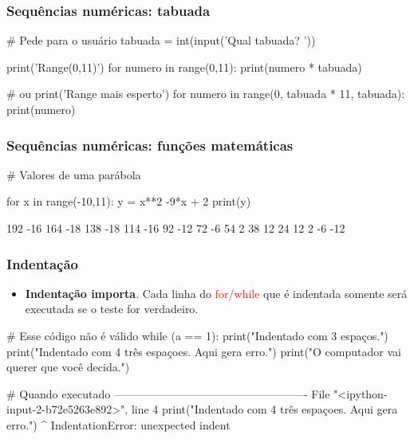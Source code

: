 \documentclass{beamer}
\begin{document}
\begin{frame}[fragile]
    \frametitle{Sequências numéricas: tabuada}

\begin{python}
# Pede para o usuário
tabuada = int(input('Qual tabuada? '))

print('Range(0,11)')
for numero in range(0,11):
    print(numero * tabuada)
    
# ou
print('Range mais esperto')
for numero in range(0, tabuada * 11, tabuada):
    print(numero)
\end{python}

\end{frame} 





\begin{frame}[fragile]
    \frametitle{Sequências numéricas: funções matemáticas}

\begin{python}
# Valores de uma parábola

for x in range(-10,11):
    y = x**2 -9*x + 2
    print(y)
    
\end{python}
\begin{python}
192		      -16
164		      -18
138		      -18
114		      -16
92 		      -12
72 		       -6
54 		       2
38 		      12
24 		      
12 		      
2 		      
-6		      
-12		      
\end{python}

\end{frame} 



\begin{frame}[fragile]
\frametitle{Indentação}

\begin{itemize}
 \vfill \item \textbf{Indentação importa}. Cada linha do \textcolor{red}{for/while} que é indentada somente será executada se o teste for verdadeiro.
\end{itemize}

\vfill \begin{python}
# Esse código não é válido
while (a == 1):
  print("Indentado com 3 espaços.")
    print("Indentado com 4 três espaçoes. Aqui gera erro.")
   print("O computador vai querer que você decida.")

# Quando executado ----------------------------------------------------   
File "<ipython-input-2-b72e5263e892>", line 4
    print("Indentado com 4 três espaçoes. Aqui gera erro.")
    ^
IndentationError: unexpected indent   
\end{python}
\end{frame}
\end{document}

